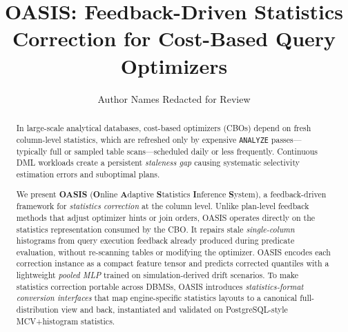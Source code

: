 \documentclass[runningheads]{llncs}
\begin{document}
\title{OASIS: Feedback-Driven Statistics Correction for Cost-Based Query Optimizers}


\author{Author Names Redacted for Review}



\maketitle

\begin{abstract}
In large-scale analytical databases, cost-based optimizers (CBOs) depend on fresh column-level statistics, which are refreshed only by expensive \texttt{ANALYZE} passes---typically full or sampled table scans---scheduled daily or less frequently. Continuous DML workloads create a persistent \emph{staleness gap} causing systematic selectivity estimation errors and suboptimal plans.

We present \textbf{OASIS} (\textbf{O}nline \textbf{A}daptive \textbf{S}tatistics \textbf{I}nference \textbf{S}ystem), a feedback-driven framework for \emph{statistics correction} at the column level. Unlike plan-level feedback methods that adjust optimizer hints or join orders, OASIS operates directly on the statistics representation consumed by the CBO. It repairs stale \emph{single-column} histograms from query execution feedback already produced during predicate evaluation, without re-scanning tables or modifying the optimizer. OASIS encodes each correction instance as a compact feature tensor and predicts corrected quantiles with a lightweight \emph{pooled MLP} trained on simulation-derived drift scenarios. To make statistics correction portable across DBMSs, OASIS introduces \emph{statistics-format conversion interfaces} that map engine-specific statistics layouts to a canonical full-distribution view and back, instantiated and validated on PostgreSQL-style MCV+histogram statistics.


\end{abstract}
\end{document}
